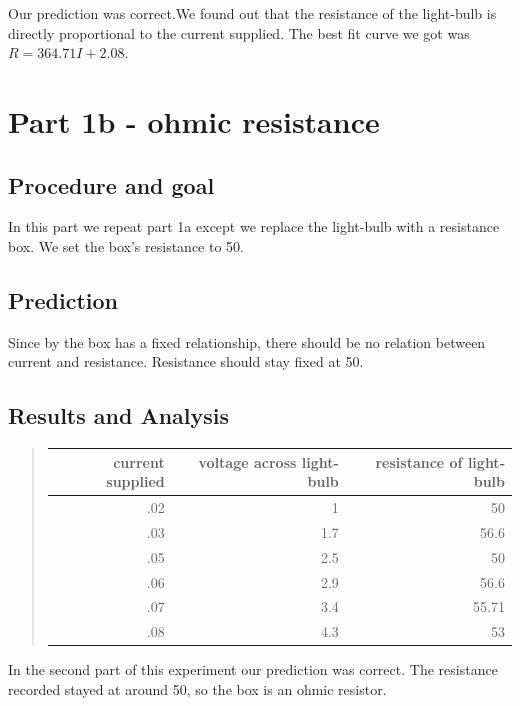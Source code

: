 \documentclass[12pt]{article}
\begin{document}
Our prediction was correct.We found out that the resistance of the light-bulb is directly proportional to the current supplied. The best fit curve we got was $R = 364.71I + 2.08$.
\section*{Part 1b - ohmic resistance}
\subsection*{Procedure and goal}
In this part we repeat part 1a except we replace the light-bulb with a resistance box. We set the box's resistance to 50.
\subsection*{Prediction}
Since by the box has a fixed relationship, there should be no relation between current and resistance. Resistance should stay fixed at 50.
\subsection*{Results and Analysis}
\begin{quote}
	\begin{tabular}{|r|r|r|}
	\hline 
	current supplied & voltage across light-bulb & resistance of light-bulb \\
	\hline 
	.02 & 1 & 50 \\
	.03 & 1.7 & 56.6 \\
	.05 & 2.5 & 50 \\
	.06 & 2.9 & 56.6 \\
	.07 & 3.4 & 55.71 \\
	.08 & 4.3 & 53 \\
	\hline 
	\end{tabular}
\end{quote}
In the second part of this experiment our prediction was correct.  The resistance recorded stayed at around 50, so the box is an ohmic resistor. 
\end{document}
